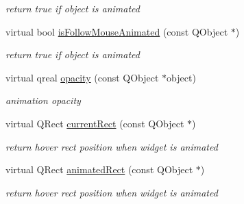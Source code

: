 \begin{DoxyCompactItemize}
\begin{DoxyCompactList}\small\item\em return true if object is animated \end{DoxyCompactList}\item 
\mbox{\label{class_tool_bar_engine_aa8f8e03f49741d6e35bfb83b81fdf83a}} 
virtual bool \hyperlink{class_tool_bar_engine_aa8f8e03f49741d6e35bfb83b81fdf83a}{is\+Follow\+Mouse\+Animated} (const Q\+Object $\ast$)
\begin{DoxyCompactList}\small\item\em return true if object is animated \end{DoxyCompactList}\item 
\mbox{\label{class_tool_bar_engine_a3c271a7cd093377576050c4b1a4bc05a}} 
virtual qreal \hyperlink{class_tool_bar_engine_a3c271a7cd093377576050c4b1a4bc05a}{opacity} (const Q\+Object $\ast$object)
\begin{DoxyCompactList}\small\item\em animation opacity \end{DoxyCompactList}\item 
\mbox{\label{class_tool_bar_engine_af598666be233e20558bbd794d9d56d08}} 
virtual Q\+Rect \hyperlink{class_tool_bar_engine_af598666be233e20558bbd794d9d56d08}{current\+Rect} (const Q\+Object $\ast$)
\begin{DoxyCompactList}\small\item\em return \textquotesingle{}hover\textquotesingle{} rect position when widget is animated \end{DoxyCompactList}\item 
\mbox{\label{class_tool_bar_engine_a6fc9fbc2ddb6bc70ed6a2298c463e776}} 
virtual Q\+Rect \hyperlink{class_tool_bar_engine_a6fc9fbc2ddb6bc70ed6a2298c463e776}{animated\+Rect} (const Q\+Object $\ast$)
\begin{DoxyCompactList}\small\item\em return \textquotesingle{}hover\textquotesingle{} rect position when widget is animated \end{DoxyCompactList}\item 
\mbox{\label{class_tool_bar_engine_af5a2dccf626356ea8eb9d330dbc07467}} 

\end{DoxyCompactItemize}
